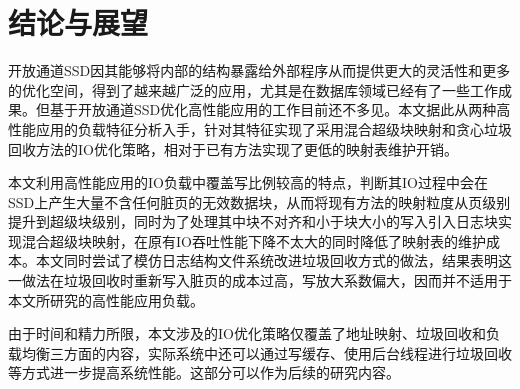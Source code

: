 \chapter{结论与展望}
\label{cha:conclusion}
开放通道SSD因其能够将内部的结构暴露给外部程序从而提供更大的灵活性和更多的优化空间，得到了越来越广泛的应用，尤其是在数据库领域已经有了一些工作成果。但基于开放通道SSD优化高性能应用的工作目前还不多见。本文据此从两种高性能应用的负载特征分析入手，针对其特征实现了采用混合超级块映射和贪心垃圾回收方法的IO优化策略，相对于已有方法实现了更低的映射表维护开销。

本文利用高性能应用的IO负载中覆盖写比例较高的特点，判断其IO过程中会在SSD上产生大量不含任何脏页的无效数据块，从而将现有方法的映射粒度从页级别提升到超级块级别，同时为了处理其中块不对齐和小于块大小的写入引入日志块实现混合超级块映射，在原有IO吞吐性能下降不太大的同时降低了映射表的维护成本。本文同时尝试了模仿日志结构文件系统改进垃圾回收方式的做法，结果表明这一做法在垃圾回收时重新写入脏页的成本过高，写放大系数偏大，因而并不适用于本文所研究的高性能应用负载。

由于时间和精力所限，本文涉及的IO优化策略仅覆盖了地址映射、垃圾回收和负载均衡三方面的内容，实际系统中还可以通过写缓存、使用后台线程进行垃圾回收等方式进一步提高系统性能。这部分可以作为后续的研究内容。